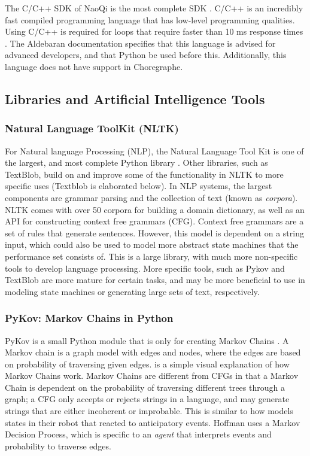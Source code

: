   The C/C++ SDK of NaoQi is the most complete SDK \cite{programmingLanguages}. C/C++ is an incredibly fast compiled programming language that has low-level programming qualities. Using C/C++ is required for loops that require faster than 10 ms response times \cite{programmingLanguages}. The Aldebaran documentation specifies that this language is advised for advanced developers, and that Python be used before this. Additionally, this language does not have support in Choregraphe.

\subsection{Libraries and Artificial Intelligence Tools}
  \subsubsection{Natural Language ToolKit (NLTK)}
    For Natural language Processing (NLP), the Natural Language Tool Kit is one of the largest, and most complete Python library \cite{nltk}. Other libraries, such as TextBlob, build on and improve some of the functionality in NLTK to more specific uses (Textblob is elaborated below). In NLP systems, the largest components are grammar parsing and the collection of text (known as \textit{corpora}). NLTK comes with over 50 corpora for building a domain dictionary, as well as an API for constructing context free grammars (CFG). Context free grammars are a set of rules that generate sentences. However, this model is dependent on a string input, which could also be used to model more abstract state machines that the performance set consists of. This is a large library, with much more non-specific tools to develop language processing. More specific tools, such as Pykov and TextBlob are more mature for certain tasks, and may be more beneficial to use in modeling state machines or generating large sets of text, respectively.

  \subsubsection{PyKov: Markov Chains in Python}
    PyKov is a small Python module that is only for creating Markov Chains \cite{pykov}. A Markov chain is a graph model with edges and nodes, where the edges are based on probability of traversing given edges. \cite{visualmarkov} is a simple visual explanation of how Markov Chains work. Markov Chains are different from CFGs in that a Markov Chain is dependent on the probability of traversing different trees through a graph; a CFG only accepts or rejects strings in a language, and may generate strings that are either incoherent or improbable. This is similar to how \cite{hoffman2010anticipation} models states in their robot that reacted to anticipatory events. Hoffman uses a Markov Decision Process, which is specific to an \textit{agent} that interprets events and probability to traverse edges.

